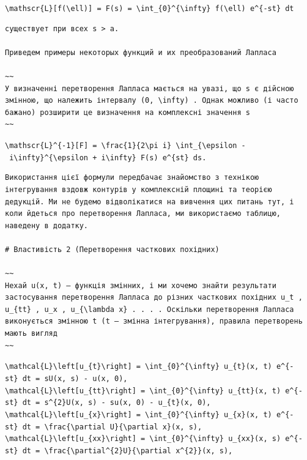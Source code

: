 \documentclass[
  ukrainian,
]{article}
\begin{document}
\texttt{\textbackslash{}mathscr\{L\}{[}f(\textbackslash{}ell){]}\ =\ F(s)\ =\ \textbackslash{}int\_\{0\}\^{}\{\textbackslash{}infty\}\ f(\textbackslash{}ell)\ e\^{}\{-st\}\ dt}

\begin{verbatim}
существует при всех s > a.

Приведем примеры некоторых функций и их преобразований Лапласа

~~
У визначенні перетворення Лапласа мається на увазі, що s є дійсною змінною, що належить інтервалу (0, \infty) . Однак можливо (і часто бажано) розширити це визначення на комплексні значення s
~~
\end{verbatim}

\texttt{\textbackslash{}mathscr\{L\}\^{}\{-1\}{[}F{]}\ =\ \textbackslash{}frac\{1\}\{2\textbackslash{}pi\ i\}\ \textbackslash{}int\_\{\textbackslash{}epsilon\ -\ i\textbackslash{}infty\}\^{}\{\textbackslash{}epsilon\ +\ i\textbackslash{}infty\}\ F(s)\ e\^{}\{st\}\ ds.}

\begin{verbatim}
Використання цієї формули передбачає знайомство з технікою інтегрування вздовж контурів у комплексній площині та теорією дедукцій. Ми не будемо відволікатися на вивчення цих питань тут, і коли йдеться про перетворення Лапласа, ми використаємо таблицю, наведену в додатку.

# Властивість 2 (Перетворення часткових похідних)

~~
Нехай u(x, t) — функція змінних, і ми хочемо знайти результати застосування перетворення Лапласа до різних часткових похідних u_t , u_{tt} , u_x , u_{\lambda x} . . . . Оскільки перетворення Лапласа виконується змінною t (t — змінна інтегрування), правила перетворень мають вигляд
~~
\end{verbatim}

\texttt{\textbackslash{}mathcal\{L\}\textbackslash{}left{[}u\_\{t\}\textbackslash{}right{]}\ =\ \textbackslash{}int\_\{0\}\^{}\{\textbackslash{}infty\}\ u\_\{t\}(x,\ t)\ e\^{}\{-st\}\ dt\ =\ sU(x,\ s)\ -\ u(x,\ 0),}
\texttt{\textbackslash{}mathcal\{L\}\textbackslash{}left{[}u\_\{tt\}\textbackslash{}right{]}\ =\ \textbackslash{}int\_\{0\}\^{}\{\textbackslash{}infty\}\ u\_\{tt\}(x,\ t)\ e\^{}\{-st\}\ dt\ =\ s\^{}\{2\}U(x,\ s)\ -\ su(x,\ 0)\ -\ u\_\{t\}(x,\ 0),}
\texttt{\textbackslash{}mathcal\{L\}\textbackslash{}left{[}u\_\{x\}\textbackslash{}right{]}\ =\ \textbackslash{}int\_\{0\}\^{}\{\textbackslash{}infty\}\ u\_\{x\}(x,\ t)\ e\^{}\{-st\}\ dt\ =\ \textbackslash{}frac\{\textbackslash{}partial\ U\}\{\textbackslash{}partial\ x\}(x,\ s),}
\texttt{\textbackslash{}mathcal\{L\}\textbackslash{}left{[}u\_\{xx\}\textbackslash{}right{]}\ =\ \textbackslash{}int\_\{0\}\^{}\{\textbackslash{}infty\}\ u\_\{xx\}(x,\ s)\ e\^{}\{-st\}\ dt\ =\ \textbackslash{}frac\{\textbackslash{}partial\^{}\{2\}U\}\{\textbackslash{}partial\ x\^{}\{2\}\}(x,\ s),}
\end{document}
